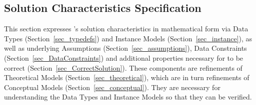 \subsection{Solution Characteristics Specification}\label{Sec_scs}

This section expresses \progname{}'s solution characteristics in mathematical
form via Data Types (Section~\ref{sec_typedefs}) and Instance Models
(Section~\ref{sec_instance}), as well as underlying Assumptions
(Section~\ref{sec_assumptions}), Data Constraints
(Section~\ref{sec_DataConstraints}) and additional properties necessary for
\progname{} to be correct (Section~\ref{sec_CorrectSolution}). These components
are refinements of Theoretical Models (Section~\ref{sec_theoretical}), which
are in turn refinements of Conceptual Models (Section~\ref{sec_conceptual}).
They are necessary for understanding the Data Types and Instance Models so that
they can be verified.



\afterpage{\clearpage}\newpage %



\newpage



\newpage



\newpage





\newpage



\newpage



\newpage



